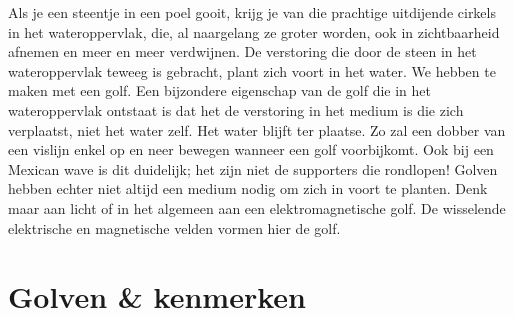 \documentclass{ximera}
\begin{document}
	\author{Bart Lambregs}



	Als je een steentje in een poel gooit, krijg je van die prachtige uitdijende cirkels in het wateroppervlak, die, al naargelang ze groter worden, ook in zichtbaarheid afnemen en meer en meer verdwijnen. De verstoring die door de steen in het wateroppervlak teweeg is gebracht, plant zich voort in het water. We hebben te maken met een golf.
	\newline
	Een bijzondere eigenschap van de golf die in het wateroppervlak ontstaat is dat het de verstoring in het medium is die zich verplaatst, niet het water zelf. Het water blijft ter plaatse. Zo zal een dobber van een vislijn enkel op en neer bewegen wanneer een golf voorbijkomt. Ook bij een Mexican wave is dit duidelijk; het zijn niet de supporters die rondlopen!
	\newline
	Golven hebben echter niet altijd een medium nodig om zich in voort te planten. Denk maar aan licht of in het algemeen aan een elektromagnetische golf. De wisselende elektrische en magnetische velden vormen hier de golf.
	
	
	
	\section{Golven \& kenmerken}
	
\end{document}
